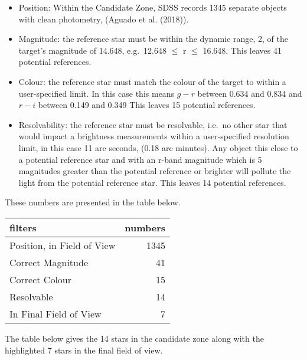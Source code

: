 \documentclass[]{elsarticle} %
\providecommand{\tightlist}{%
  \setlength{\itemsep}{0pt}\setlength{\parskip}{0pt}}
\begin{document}
\begin{itemize}
\tightlist
\item
  Position: Within the Candidate Zone, SDSS records 1345 separate
  objects with clean photometry, (Aguado et al. (2018)).
\item
  Magnitude: the reference star must be within the dynamic range, 2, of
  the target's magnitude of 14.648, e.g.~12.648 \(\leq\) r \(\leq\)
  16.648. This leaves 41 potential references.
\item
  Colour: the reference star must match the colour of the target to
  within a user-specified limit. In this case this means \(g - r\)
  between 0.634 and 0.834 and \(r - i\) between 0.149 and 0.349 This
  leaves 15 potential references.
\item
  Resolvability: the reference star must be resolvable, i.e.~no other
  star that would impact a brightness measurements within a
  user-specified resolution limit, in this case 11 arc seconds, (0.18
  arc minutes). Any object this close to a potential reference star and
  with an r-band magnitude which is 5 magnitudes greater than the
  potential reference or brighter will pollute the light from the
  potential reference star. This leaves 14 potential references.
\end{itemize}

These numbers are presented in the table below. \vskip 0.2in

\begin{table}[H]
\centering
\begin{tabular}{l|r}
\hline
filters & numbers\\
\hline
Position, in Field of View & 1345\\
\hline
Correct Magnitude & 41\\
\hline
Correct Colour & 15\\
\hline
Resolvable & 14\\
\hline
In Final Field of View & 7\\
\hline
\end{tabular}
\end{table}

\vskip 0.2in

The table below gives the 14 stars in the candidate zone along with the
highlighted 7 stars in the final field of view.

\vskip 0.2in
\end{document}
